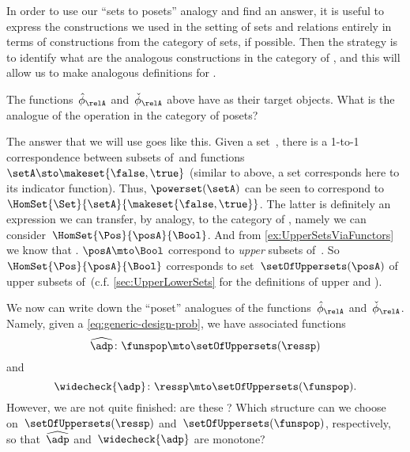 In order to use our ``sets to posets'' analogy and find an answer, it is useful to express the constructions we used in the setting of sets and relations entirely in terms of constructions from the category of sets, if possible.
Then the strategy is to identify what are the analogous constructions in the category of , and this will allow us to make analogous definitions for .

The functions~$\hat \phi_{\relA}$ and~$\check \phi_{\relA}$ above have  as their target objects.
What is the analogue of the  operation in the category of posets?

The answer that we will use goes like this.
Given a set~\setA, there is a 1-to-1 correspondence between subsets of~\setA and functions~$\setA \sto \makeset{ \false, \true }$ (similar to above, a set corresponds here to its indicator function).
Thus, $\powerset (\setA)$ can be seen to correspond to~$\HomSet{\Set}{\setA}{\makeset{ \false, \true}}$.
The latter is definitely an expression we can transfer, by analogy, to the category of , namely we can consider~$\HomSet{\Pos}{\posA}{\Bool}$.
And from \cref{ex:UpperSetsViaFunctors} we know that .
$\posA \mto \Bool$ correspond to \emph{upper} subsets of~\posA.
So~$\HomSet{\Pos}{\posA}{\Bool}$ corresponds to set~$\setOfUppersets (\posA)$ of upper subsets of~\posA (c.f.
\cref{sec:UpperLowerSets} for the definitions of upper and ).

We now can write down the ``poset'' analogues of the functions~$\hat \phi_{\relA}$ and~$\check \phi_{\relA}$.
Namely, given a  \cref{eq:generic-design-prob}, we have associated functions
\begin{equation}
    \label{eq:dp-left-curry}
    \widehat{\adp} \colon \funspop \mto \setOfUppersets (\ressp)
\end{equation}
and
\begin{equation}
    \label{eq:dp-right-curry}
    \widecheck{\adp} \colon \ressp \mto \setOfUppersets (\funspop).
\end{equation}
However, we are not quite finished: are these  ?
Which  structure can we choose on~$\setOfUppersets (\ressp)$ and~$\setOfUppersets (\funspop)$, respectively, so that~$\widehat{\adp}$ and~$\widecheck{\adp}$ are monotone?

